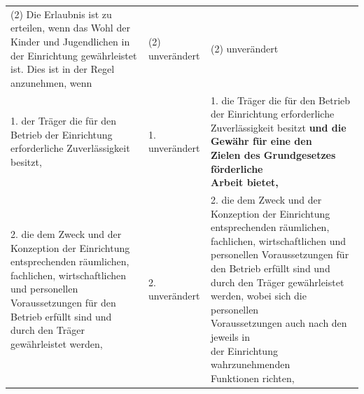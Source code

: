 \documentclass[10pt,a4paper,landscape]{article}
\begin{document}
\begin{longtable}{|L{8.2cm}|L{8.2cm}|L{8.2cm}|}
\hhline{|---|}
(2) Die Erlaubnis ist zu erteilen, wenn das  \newline Wohl der Kinder und Jugendlichen in der  \newline Einrichtung gewährleistet ist. Dies ist in der  \newline Regel anzunehmen, wenn & (2) unverändert & (2) unverändert \\
\hhline{|---|}
1.  \newline \textcolor{diffred}{der} Träger die für den Betrieb der  \newline Einrichtung erforderliche Zuverlässigkeit  \newline \textcolor{diffred}{besitzt,} & 1. unverändert & 1.   \newline \textcolor{diffgreen}{die} Träger die für den Betrieb der  \newline Einrichtung erforderliche Zuverlässigkeit  \newline \textcolor{diffgreen}{besitzt }\textbf{\textcolor{diffgreen}{und die Gewähr für eine den  \newline Zielen des Grundgesetzes förderliche  \newline Arbeit bietet,}} \\
\hhline{|---|}
2.  \newline die dem Zweck und der Konzeption der  \newline Einrichtung entsprechenden räumlichen,  \newline fachlichen, wirtschaftlichen und personellen  \newline Voraussetzungen für den Betrieb erfüllt  \newline sind und durch den Träger gewährleistet  \newline werden, & 2. unverändert & 2.   \newline die dem Zweck und der Konzeption der  \newline Einrichtung entsprechenden räumlichen,  \newline fachlichen, wirtschaftlichen und personellen  \newline Voraussetzungen für den Betrieb erfüllt  \newline sind und durch den Träger gewährleistet  \newline werden, \textcolor{diffgreen}{wobei sich die personellen  \newline Voraussetzungen auch nach den jeweils in  \newline der Einrichtung wahrzunehmenden  \newline Funktionen richten,} \\

\end{longtable}
\end{document}
